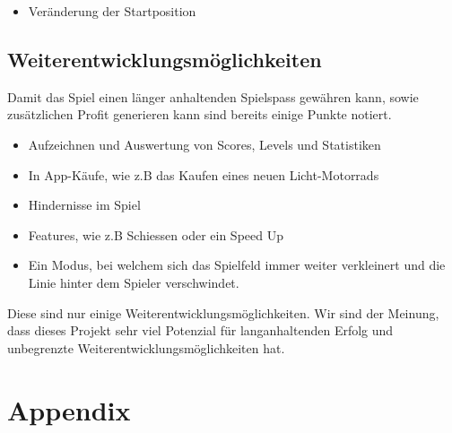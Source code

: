 \documentclass[11pt,ngerman]{article}
\begin{document}
	\begin{itemize}
		\item Veränderung der Startposition
	\end{itemize}

    \subsection{Weiterentwicklungsmöglichkeiten}
    
    Damit das Spiel einen länger anhaltenden Spielspass gewähren kann, sowie zusätzlichen Profit generieren kann sind bereits einige Punkte notiert. 
    
    \begin{itemize}
	    \item Aufzeichnen und Auswertung von Scores, Levels und Statistiken
	    \item In App-Käufe, wie z.B das Kaufen eines neuen Licht-Motorrads
	    \item Hindernisse im Spiel
	    \item Features, wie z.B Schiessen oder ein Speed Up
		\item Ein Modus, bei welchem sich das Spielfeld immer weiter verkleinert und die Linie hinter dem Spieler verschwindet.
	\end{itemize}

	Diese sind nur einige Weiterentwicklungsmöglichkeiten. Wir sind der Meinung, dass dieses Projekt sehr viel Potenzial für langanhaltenden Erfolg und unbegrenzte Weiterentwicklungsmöglichkeiten hat.

    \section{Appendix}
\end{document}
